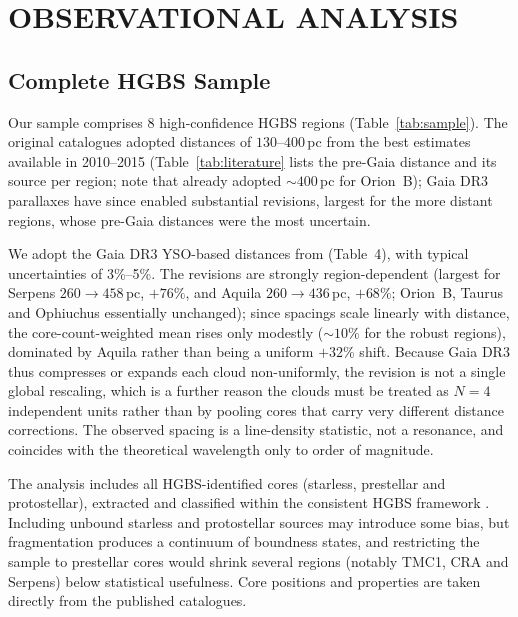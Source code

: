 \documentclass[usenatbib,twoside,twocolumn]{mnras}
\begin{document}
\section{OBSERVATIONAL ANALYSIS}

\subsection{Complete HGBS Sample}

Our sample comprises 8 high-confidence HGBS regions (Table~\ref{tab:sample}). The original catalogues \citep{Konyves2015, Konyves2020, Ladjelate2020, Pezzuto2021} adopted distances of $130$--$400$\,pc from the best estimates available in 2010--2015 (Table~\ref{tab:literature} lists the pre-Gaia distance and its source per region; note that \citealt{Konyves2020} already adopted $\sim400$\,pc for Orion~B); Gaia DR3 parallaxes \citep{Zhang2023} have since enabled substantial revisions, largest for the more distant regions, whose pre-Gaia distances were the most uncertain.

We adopt the Gaia DR3 YSO-based distances from \citet{Zhang2023} (Table~4), with typical uncertainties of 3\%--5\%. The revisions are strongly region-dependent (largest for Serpens $260\to458$\,pc, $+76\%$, and Aquila $260\to436$\,pc, $+68\%$; Orion~B, Taurus and Ophiuchus essentially unchanged); since spacings scale linearly with distance, the core-count-weighted mean rises only modestly ($\sim10\%$ for the robust regions), dominated by Aquila rather than being a uniform $+32\%$ shift. Because Gaia DR3 thus compresses or expands each cloud non-uniformly, the revision is not a single global rescaling, which is a further reason the clouds must be treated as $N=4$ independent units rather than by pooling cores that carry very different distance corrections. The observed spacing is a line-density statistic, not a resonance, and coincides with the theoretical wavelength only to order of magnitude.

The analysis includes all HGBS-identified cores (starless, prestellar and protostellar), extracted and classified within the consistent HGBS framework \citep{Konyves2015, Konyves2020}. Including unbound starless and protostellar sources may introduce some bias, but fragmentation produces a continuum of boundness states, and restricting the sample to prestellar cores would shrink several regions (notably TMC1, CRA and Serpens) below statistical usefulness. Core positions and properties are taken directly from the published catalogues.
\end{document}
